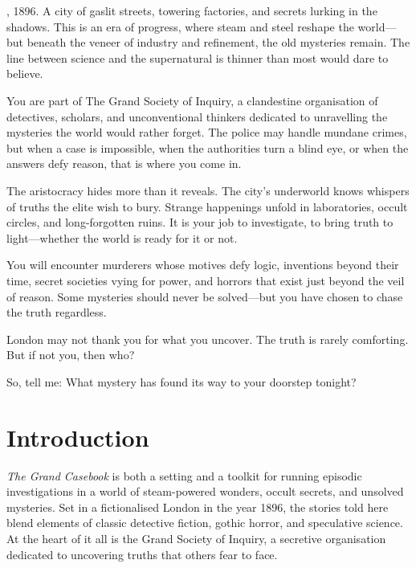 
\begin{WyrdSettingHeading}
    , 1896. A city of gaslit streets, towering factories, and secrets lurking in the shadows. This is an era of progress, where steam and steel reshape the world—but beneath the veneer of industry and refinement, the old mysteries remain. The line between science and the supernatural is thinner than most would dare to believe.

    \raggedright
    You are part of The Grand Society of Inquiry, a clandestine organisation of detectives, scholars, and unconventional thinkers dedicated to unravelling the mysteries the world would rather forget. The police may handle mundane crimes, but when a case is impossible, when the authorities turn a blind eye, or when the answers defy reason, that is where you come in.

    The aristocracy hides more than it reveals. The city's underworld knows whispers of truths the elite wish to bury. Strange happenings unfold in laboratories, occult circles, and long-forgotten ruins. It is your job to investigate, to bring truth to light—whether the world is ready for it or not.

    You will encounter murderers whose motives defy logic, inventions beyond their time, secret societies vying for power, and horrors that exist just beyond the veil of reason. Some mysteries should never be solved—but you have chosen to chase the truth regardless.

    London may not thank you for what you uncover. The truth is rarely comforting. But if not you, then who?

    So, tell me: What mystery has found its way to your doorstep tonight?
\end{WyrdSettingHeading}

\section{Introduction}

\textit{The Grand Casebook} is both a setting and a toolkit for running episodic investigations in a world of steam-powered wonders, occult secrets, and unsolved mysteries. Set in a fictionalised London in the year 1896, the stories told here blend elements of classic detective fiction, gothic horror, and speculative science. At the heart of it all is the Grand Society of Inquiry, a secretive organisation dedicated to uncovering truths that others fear to face.

